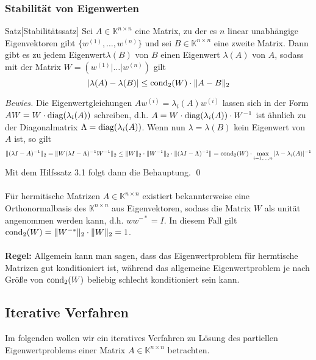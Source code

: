 \documentclass{article}
\begin{document}
    \subsubsection{Stabilität von Eigenwerten}
    \begin{thmbox}{Satz}[Stabilitätssatz]
        Sei $A\in\mathbb{K}^{n\times n}$ eine Matrix, zu der es $n$ linear unabhängige Eigenvektoren gibt 
        $\{w^{(1)},\dotsc,w^{(n)}\}$ und sei $B\in\mathbb{K}^{n\times n}$ eine zweite Matrix. Dann gibt es zu 
        jedem Eigenwert$\lambda(B)$ von $B$ einen Eigenwert $\lambda(A)$ von $A$, sodass mit der Matrix 
        $W=(w^{(1)}|\dotsc|w^{(n)})$ gilt
        \[|\lambda(A)-\lambda(B)|\leq\text{cond}_2(W)\cdot\|A-B\|_2\]
    \end{thmbox}
    \textit{Bewies.} Die Eigenwertgleichungen $Aw^{(i)}=\lambda_i(A)w^{(i)}$ lassen sich in der Form 
    $AW=W\cdot\text{diag}(\lambda_i(A))$ schreiben, d.h. $A=W\cdot\text{diag}(\lambda_i(A))\cdot W^{-1}$ ist ähnlich zu der 
    Diagonalmatrix $\Lambda = \text{diag}(\lambda_i(A))$. Wenn nun $\lambda=\lambda(B)$ kein Eigenwert von $A$ ist, so gilt 
    \[\|(\lambda I - A)^{-1}\|_2 = \|W(\lambda I - \Lambda)^{-1}W^{-1}\|_2 
    \leq \|W\|_2\cdot\|W^{-1}\|_2\cdot\|(\lambda I-\Lambda)^{-1}\| 
    = \text{cond}_2(W)\cdot \max_{i=1,\dotsc,n} |\lambda-\lambda_i(A)|^{-1}\]
    Mit dem Hilfssatz 3.1 folgt dann die Behauptung. \qed \\ \\
    Für hermitische Matrizen $A\in\mathbb{K}^{n\times n}$ existiert bekannterweise eine Orthonormalbasis des 
    $\mathbb{K}^{n\times n}$ aus Eigenvektoren, sodass die Matrix $W$ als unität angenommen werden kann, 
    d.h. $ww^{-*}=I$. In diesem Fall gilt $\text{cond}_2(W)=\|W^{-*}\|_2\cdot\|W\|_2 = 1$. \\ \\
    \textbf{Regel:} Allgemein kann man sagen, dass das Eigenwertproblem für hermtische Matrizen gut konditioniert
    ist, während das allgemeine Eigenwertproblem je nach Größe von $\text{cond}_2(W)$ beliebig schlecht konditioniert 
    sein kann.
    \subsection{Iterative Verfahren}
    Im folgenden wollen wir ein iteratives Verfahren zu Lösung des partiellen Eigenwertproblems einer 
    Matrix $A\in\mathbb{K}^{n\times n}$ betrachten.
\end{document}
